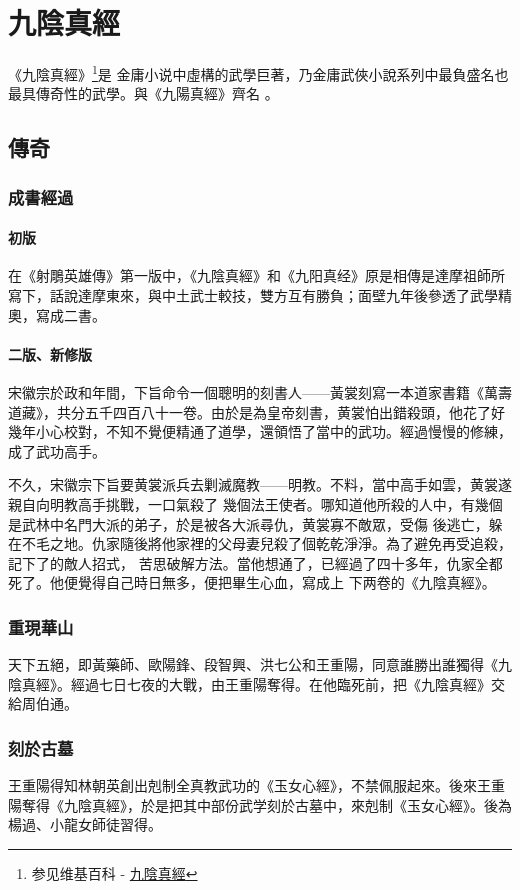 \chapter{九陰真經}
《九陰真經》\footnote{参见维基百科 -
  \href{http://zh.wikipedia.org/wiki/\%E4\%B9\%9D\%E9\%99\%B0\%E7\%9C\%9F\%E7\%B6\%93}{九陰真經}}是
金庸小说中虛構的武學巨著，乃金庸武俠小說系列中最負盛名也最具傳奇性的武學。與《九陽真經》齊名
\cite{jyinzj}。 

\section{傳奇}

\subsection{成書經過}

\subsubsection{初版}
在《射鵰英雄傳》第一版中，《九陰真經》和《九阳真经》原是相傳是達摩祖師所寫下，話說達摩東來，與中土武士較技，雙方互有勝負；面壁九年後參透了武學精奧，寫成二書。
\subsubsection{二版、新修版}
宋徽宗於政和年間，下旨命令一個聰明的刻書人——黃裳刻寫一本道家書籍《萬壽道藏》，共分五千四百八十一卷。由於是為皇帝刻書，黄裳怕出錯殺頭，他花了好幾年小心校對，不知不覺便精通了道學，還領悟了當中的武功。經過慢慢的修練，成了武功高手。

不久，宋徽宗下旨要黄裳派兵去剿滅魔教——明教。不料，當中高手如雲，黄裳遂親自向明教高手挑戰，一口氣殺了
幾個法王使者。哪知道他所殺的人中，有幾個是武林中名門大派的弟子，於是被各大派尋仇，黄裳寡不敵眾，受傷
後逃亡，躲在不毛之地。仇家隨後將他家裡的父母妻兒殺了個乾乾淨淨。為了避免再受追殺，記下了的敵人招式，
苦思破解方法。當他想通了，已經過了四十多年，仇家全都死了。他便覺得自己時日無多，便把畢生心血，寫成上
下两卷的《九陰真經》。

\subsection{重現華山}
天下五絕，即黃藥師、歐陽鋒、段智興、洪七公和王重陽，同意誰勝出誰獨得《九陰真經》。經過七日七夜的大戰，由王重陽奪得。在他臨死前，把《九陰真經》交給周伯通。
\subsection{刻於古墓}
王重陽得知林朝英創出剋制全真教武功的《玉女心經》，不禁佩服起來。後來王重陽奪得《九陰真經》，於是把其中部份武学刻於古墓中，來剋制《玉女心經》。後為楊過、小龍女師徒習得。
